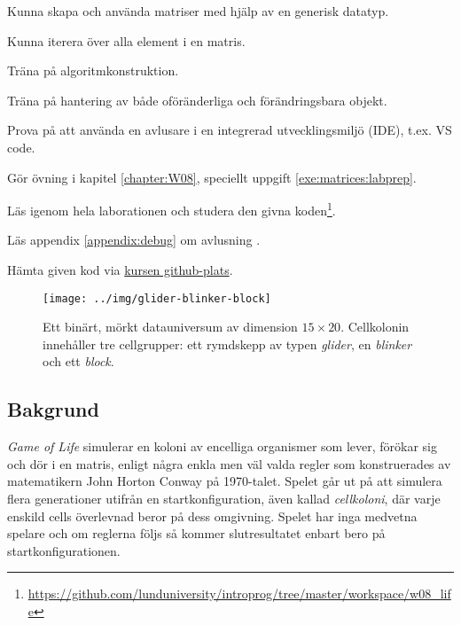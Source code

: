 
\Lab{\LabWeekEIGHT}

\begin{Goals}
\item Kunna skapa och använda matriser med hjälp av en generisk datatyp.
\item Kunna iterera över alla element i en matris.
\item Träna på algoritmkonstruktion.
\item Träna på hantering av både oföränderliga och förändringsbara objekt.
\item Prova på att använda en avlusare  i en integrerad utvecklingsmiljö (IDE), t.ex. VS code.
\end{Goals}

\begin{Preparations}
\item Gör övning {\tt \ExeWeekEIGHT} i kapitel \ref{chapter:W08}, speciellt uppgift \ref{exe:matrices:labprep}.

\item Läs igenom hela laborationen och studera den givna koden\footnote{\url{https://github.com/lunduniversity/introprog/tree/master/workspace/w08_life}}.
\item Läs appendix \ref{appendix:debug} om avlusning .
\item Hämta given kod via \href{https://github.com/lunduniversity/introprog/tree/master/workspace/}{kursen github-plats}.

\end{Preparations}


\begin{figure}[H]
  \texttt{[image: ../img/glider-blinker-block]}

  \vspace{-2em}\caption{\label{lab:life:glider-blinker-block}Ett binärt, mörkt datauniversum av dimension $15  \times 20$. Cellkolonin innehåller tre cellgrupper: ett rymdskepp av typen \emph{glider}, en \emph{blinker} och ett \emph{block}.}
\end{figure}


\subsection{Bakgrund}

\emph{Game of Life} simulerar en koloni av encelliga organismer som lever, förökar sig och dör i en matris, enligt några enkla men väl valda regler som konstruerades av matematikern John Horton Conway på 1970-talet. Spelet går ut på att simulera flera generationer utifrån en startkonfiguration, även kallad \emph{cellkoloni}, där varje enskild cells överlevnad beror på dess omgivning. Spelet har inga medvetna spelare och om reglerna följs så kommer slutresultatet enbart bero på startkonfigurationen.

